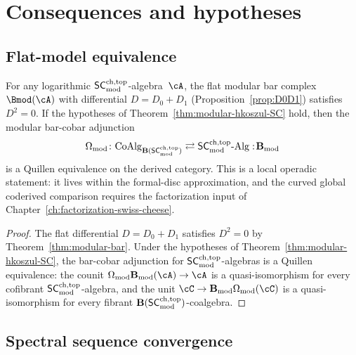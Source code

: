 \section{Consequences and hypotheses}
\label{sec:modular-sc-consequences}

\subsection{Flat-model equivalence}
\label{subsec:flat-model-equiv}

\begin{corollary}
\label{cor:flat-model-equiv}
For any logarithmic $\mathsf{SC}^{\mathrm{ch,top}}_{\mathrm{mod}}$-algebra~$\cA$, the flat modular bar
complex $\Bmod(\cA)$ with differential $D = D_0 + D_1$
\textup{(}Proposition~\textup{\ref{prop:D0D1})} satisfies $D^2 = 0$.
If the hypotheses of
Theorem~\ref{thm:modular-hkoszul-SC} hold, then the modular bar-cobar
adjunction
\[
 \Omega_{\mathrm{mod}} \colon
 \mathrm{CoAlg}_{\mathbf{B}(\mathsf{SC}^{\mathrm{ch,top}}_{\mathrm{mod}})}
 \rightleftarrows
 {\mathsf{SC}^{\mathrm{ch,top}}_{\mathrm{mod}}}\text{-}\mathrm{Alg}
:\! \mathbf{B}_{\mathrm{mod}}
\]
is a Quillen equivalence on the derived category. This is a local
operadic statement: it lives within the formal-disc approximation, and
the curved global coderived comparison requires the factorization input
of Chapter~\ref{ch:factorization-swiss-cheese}.
\end{corollary}

\begin{proof}
The flat differential $D = D_0 + D_1$ satisfies $D^2 = 0$ by
Theorem~\ref{thm:modular-bar}. Under the hypotheses of
Theorem~\ref{thm:modular-hkoszul-SC}, the bar-cobar adjunction for
$\mathsf{SC}^{\mathrm{ch,top}}_{\mathrm{mod}}$-algebras is a Quillen equivalence: the counit
$\Omega_{\mathrm{mod}} \mathbf{B}_{\mathrm{mod}}(\cA) \to \cA$
is a quasi-isomorphism for every cofibrant $\mathsf{SC}^{\mathrm{ch,top}}_{\mathrm{mod}}$-algebra,
and the unit
$\cC \to \mathbf{B}_{\mathrm{mod}} \Omega_{\mathrm{mod}}(\cC)$
is a quasi-isomorphism for every fibrant
$\mathbf{B}(\mathsf{SC}^{\mathrm{ch,top}}_{\mathrm{mod}})$-coalgebra.
\end{proof}


\subsection{Spectral sequence convergence}
\label{subsec:spec-seq-convergence}

